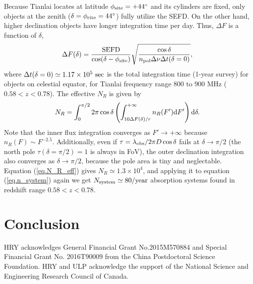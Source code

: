 \documentclass[]{raa}
\newcommand{\diff}{{\rm d}}
\begin{document}
Because Tianlai locates at latitude
$\phi_{\rm site}=+44^\circ$ and its cylinders are fixed, only
objects at the zenith ($\delta=\phi_{\rm cite}=44^\circ$) fully utilize
the SEFD. On the other hand, higher declination objects
have longer integration time per day. Thus, $\Delta F$ is
a function of $\delta$, 
\begin{equation}\label{eq.delta_F_delta}
    \Delta F(\delta) = \frac{\rm SEFD}{\cos(\delta-\phi_{\rm site})}
    {\sqrt{\frac{\cos\delta}{n_{\rm pol}\Delta\nu\Delta t(\delta=0)}}},
\end{equation}
where $\Delta t(\delta=0)\simeq 1.17\times 10^5\ {\rm sec}$ is the
total integration time (1-year survey) for objects on celestial equator,
for Tianlai frequency range 800 to 900 MHz ($0.58<z<0.78$).
The effective $N_R$ is given by
\begin{equation}\label{eq.N_R_eff}
    N_R=\int_0^{\pi/2}2\pi\cos\delta
    \left(\int_{10\Delta F(\delta)/r}^{+\infty}
    n_R(F')\diff F'\right)
    \diff\delta.
\end{equation}
Note that the inner flux integration converges as
$F'\rightarrow+\infty$ because $n_R(F)\sim F^{-2.5}$.
Additionally, even if $\tau=\lambda_{\rm obs}/2\pi D\cos\delta$
fails at $\delta\rightarrow\pi/2$ (the north pole
$\tau(\delta=\pi/2)=1$ is always in FoV),
the outer declination integration also converges
as $\delta\rightarrow\pi/2$, because the pole area is
tiny and neglectable.
Equation (\ref{eq.N_R_eff}) gives $N_R\simeq 1.3\times 10^4$,
and applying it to equation (\ref{eq.n_system}) again
we get $N_{\rm system}\simeq 80 {\rm /year}$ absorption
systems found in redshift range $0.58<z<0.78$.

\section{Conclusion}\label{sec.conclusion}

\begin{acknowledgements}
HRY acknowledges General Financial Grant No.2015M570884 and
Special Financial Grant No. 2016T90009 from the China
Postdoctoral Science Foundation.
HRY and ULP acknowledge the support of the
National Science and Engineering Research Council of Canada.
\end{acknowledgements}



\end{document}
